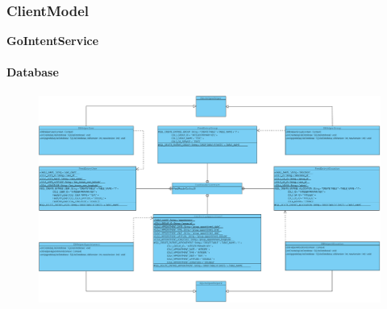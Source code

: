 \subsubsection{ClientModel}

\textbf{GoIntentService}

\paragraph{Database}
\begin{figure}[H]
	\includegraphics[scale = .3]{res/umlDiagramms/modelClientDatabase.pdf}
	\centering	
\end{figure}

